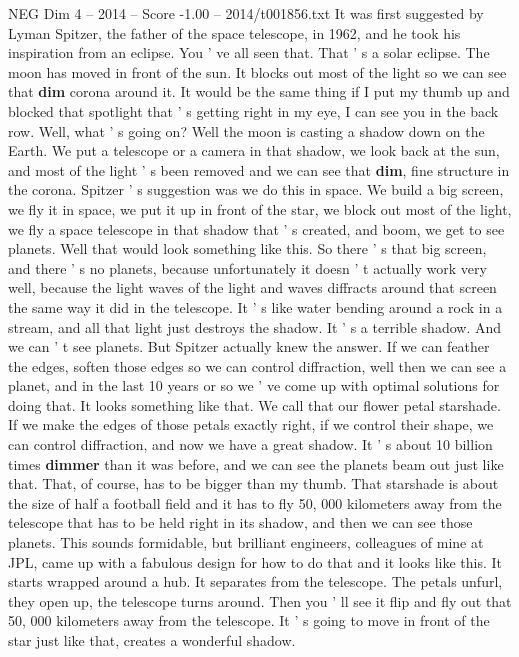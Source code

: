 \begin{textsample}{NEG Dim 4 – 2014 – Score -1.00 – 2014/t001856.txt}
It was first suggested by Lyman Spitzer, the father of the space telescope, in 1962, and he took his inspiration from an eclipse.
You ' ve all seen that.
That ' s a solar eclipse.
The moon has moved in front of the sun.
It blocks out most of the light so we can see that \textbf{dim} corona around it.
It would be the same thing if I put my thumb up and blocked that spotlight that ' s getting right in my eye, I can see you in the back row.
Well, what ' s going on?
Well the moon is casting a shadow down on the Earth.
We put a telescope or a camera in that shadow, we look back at the sun, and most of the light ' s been removed and we can see that \textbf{dim}, fine structure in the corona.
Spitzer ' s suggestion was we do this in space.
We build a big screen, we fly it in space, we put it up in front of the star, we block out most of the light, we fly a space telescope in that shadow that ' s created, and boom, we get to see planets.
Well that would look something like this.
So there ' s that big screen, and there ' s no planets, because unfortunately it doesn ' t actually work very well, because the light waves of the light and waves diffracts around that screen the same way it did in the telescope.
It ' s like water bending around a rock in a stream, and all that light just destroys the shadow.
It ' s a terrible shadow.
And we can ' t see planets.
But Spitzer actually knew the answer.
If we can feather the edges, soften those edges so we can control diffraction, well then we can see a planet, and in the last 10 years or so we ' ve come up with optimal solutions for doing that.
It looks something like that.
We call that our flower petal starshade.
If we make the edges of those petals exactly right, if we control their shape, we can control diffraction, and now we have a great shadow.
It ' s about 10 billion times \textbf{dimmer} than it was before, and we can see the planets beam out just like that.
That, of course, has to be bigger than my thumb.
That starshade is about the size of half a football field and it has to fly 50, 000 kilometers away from the telescope that has to be held right in its shadow, and then we can see those planets.
This sounds formidable, but brilliant engineers, colleagues of mine at JPL, came up with a fabulous design for how to do that and it looks like this.
It starts wrapped around a hub.
It separates from the telescope.
The petals unfurl, they open up, the telescope turns around.
Then you ' ll see it flip and fly out that 50, 000 kilometers away from the telescope.
It ' s going to move in front of the star just like that, creates a wonderful shadow.

\end{textsample}
